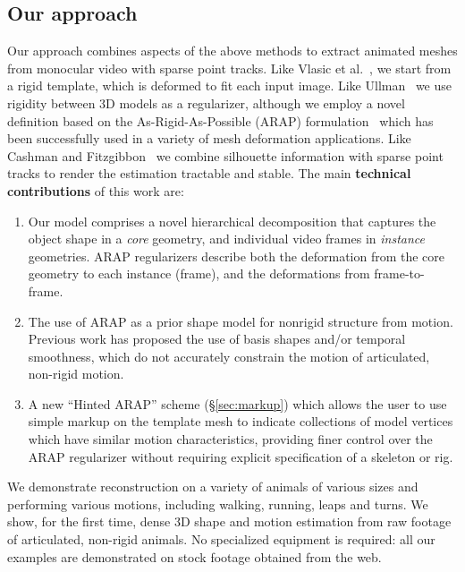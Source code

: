 \documentclass[preprint]{acmsiggraph}
\begin{document}
\subsection{Our approach}
Our approach combines aspects of the above methods to extract animated meshes from monocular video with sparse point tracks.  Like Vlasic et al.~, we start from a rigid template, which is deformed to fit each input image.   Like Ullman~ we use rigidity between 3D models as a regularizer, although we employ a novel definition based on the As-Rigid-As-Possible (ARAP) formulation~\cite{Alexa:2000:ARA,Sorkine:2007:ARA} which has been successfully used in a variety of mesh deformation applications. Like Cashman and Fitzgibbon~ we combine silhouette information with sparse point tracks to render the estimation tractable and stable.  The main {\bf technical contributions} of this work are:
\begin{enumerate}
\item
Our model comprises a novel hierarchical decomposition that captures the object shape in a {\em core} geometry, and individual video frames in {\em instance} geometries. ARAP regularizers describe both the deformation from the core geometry to each instance (frame), and the deformations from frame-to-frame.
\item
The use of ARAP as a prior shape model for nonrigid structure from motion.  Previous work has proposed the use of basis shapes and/or temporal smoothness, which do not accurately constrain the motion of articulated, non-rigid motion.
\item
A new ``Hinted ARAP'' scheme (\S\ref{sec:markup}) which allows the user to use simple markup on the template mesh to indicate collections of model vertices which have similar motion characteristics, providing finer control over the ARAP regularizer without requiring explicit specification of a skeleton or rig.
\end{enumerate}
We demonstrate reconstruction on a variety of animals of various sizes
and performing various motions, including walking, running, leaps and turns. We show, for
the first time, dense 3D shape and motion estimation from raw footage
of articulated,  non-rigid animals. 
No specialized equipment is required: all our examples are
demonstrated on stock footage obtained from the web.
\end{document}

